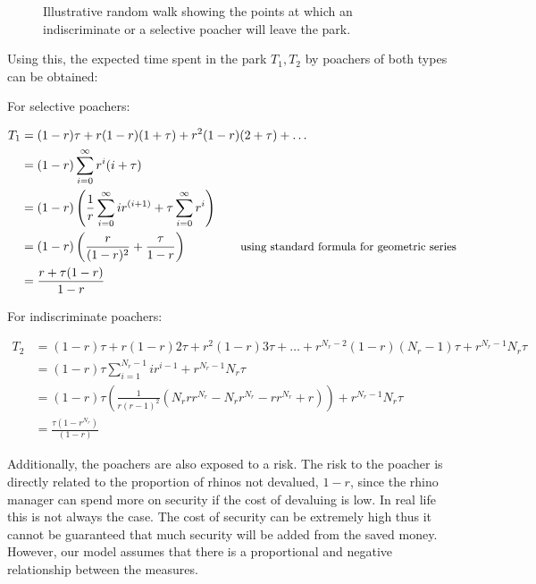 \documentclass[10pt]{article}
\begin{document}
\begin{figure}[!htbp]
\begin{center}
    \end{center}
    \caption{Illustrative random walk showing the points at which an
    indiscriminate or a selective poacher will leave the park.}

    \label{fig:random_walk}
\end{figure}

Using this, the expected time spent in the park \(T_1, T_2\) by poachers of both
types can be obtained:

For selective poachers:

\begin{equation}
    \begin{split}
    T_1 &= (1-r) \tau + r(1-r)(1+ \tau) + r^2(1-r)(2+ \tau) + \dots\\
        &= (1-r) \sum_{i=0}^{\infty}r^i(i + \tau)\\
        &= (1-r) \left ( \frac{1} {r} \sum_{i=0} ^ {\infty} i r ^ {(i+1)} + \tau \sum_{i=0} ^ {\infty} r ^ i \right)\\
        &= (1-r)\left(\frac{r}{(1-r)^2} + \frac{\tau}{1-r}\right) \quad \quad \quad \quad \text{ \small{using standard
formula for geometric series}}\\
    &= \frac{r+\tau(1-r)}{1-r}
    \end{split}
\end{equation}

For indiscriminate poachers:

\begin{equation}
    \begin{split}
    T_2 &= (1-r)\tau + r(1-r)2\tau + r^2(1-r)3\tau + \dots + r^{N_r -
    2}(1-r)(N_r - 1)\tau + r^{N_r - 1}N_r\tau\\
        &= (1-r)\tau\sum_{i=1}^{N_r - 1}ir^{i-1} + r^{N_r - 1}N_r\tau \\
        &= (1-r)\tau\left(\frac{1}{r \left(r - 1\right)^{2}} \left(N_{r} r
r^{N_{r}} - N_{r} r^{N_{r}} - r r^{N_{r}} + r\right)\right) + r^{N_r - 1}N_r\tau \\
        &= \frac{\tau(1 - r^{N_r})}{(1 - r)}
    \end{split}
\end{equation}

Additionally, the poachers are also exposed to a risk. The risk to the poacher is
directly related to the proportion of rhinos not devalued, \(1 - r\), since
the rhino manager can spend more on security if the cost of devaluing is low.
In real life this is not always the case. The cost of security can be extremely
high thus it cannot be guaranteed that much security will be added from the
saved money. However, our model assumes that there is a proportional and negative
relationship between the measures.
\end{document}
